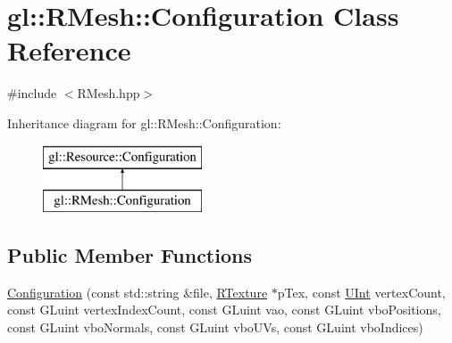 \hypertarget{classgl_1_1_r_mesh_1_1_configuration}{\section{gl\-:\-:R\-Mesh\-:\-:Configuration Class Reference}
\label{classgl_1_1_r_mesh_1_1_configuration}
}


{\ttfamily \#include $<$R\-Mesh.\-hpp$>$}

Inheritance diagram for gl\-:\-:R\-Mesh\-:\-:Configuration\-:\begin{figure}[H]
\begin{center}
\leavevmode
\includegraphics[height=2.000000cm]{classgl_1_1_r_mesh_1_1_configuration}
\end{center}
\end{figure}
\subsection*{Public Member Functions}
\begin{DoxyCompactItemize}
\item 
\hyperlink{classgl_1_1_r_mesh_1_1_configuration_a7df6f9974c2dbd5178d25c4a81bff7e2}{Configuration} (const std\-::string \&file, \hyperlink{classgl_1_1_r_texture}{R\-Texture} $\ast$p\-Tex, const \hyperlink{_basic_types_8hpp_a11c112f01a7ad8f767fd48bc916463a3}{U\-Int} vertex\-Count, const G\-Luint vertex\-Index\-Count, const G\-Luint vao, const G\-Luint vbo\-Positions, const G\-Luint vbo\-Normals, const G\-Luint vbo\-U\-Vs, const G\-Luint vbo\-Indices)
\end{DoxyCompactItemize}
